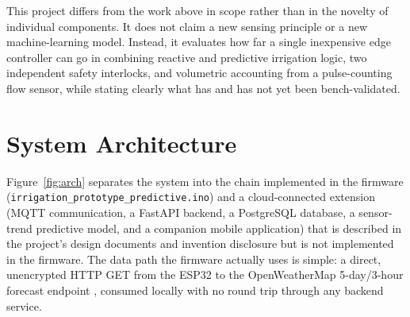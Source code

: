 \documentclass[conference]{IEEEtran}
\begin{document}
This project differs from the work above in scope rather than in the novelty of
individual components. It does not claim a new sensing principle or a new
machine-learning model. Instead, it evaluates how far a single inexpensive
edge controller can go in combining reactive and predictive irrigation logic,
two independent safety interlocks, and volumetric accounting from a pulse-counting
flow sensor, while stating clearly what has and has not yet been bench-validated.

\section{System Architecture}
\label{sec:architecture}

Figure~\ref{fig:arch} separates the system into the chain implemented in
the firmware (\texttt{irrigation\_prototype\_predictive.ino}) and a
cloud-connected extension (MQTT communication, a FastAPI backend, a
PostgreSQL database, a sensor-trend predictive model, and a companion
mobile application) that is described in the project's design documents
and invention disclosure but is not implemented in the firmware. The
data path the firmware actually uses is simple: a direct, unencrypted
HTTP GET from the ESP32 to the OpenWeatherMap 5-day/3-hour forecast
endpoint \cite{owm2024forecast}, consumed locally with no round trip
through any backend service.
\end{document}
